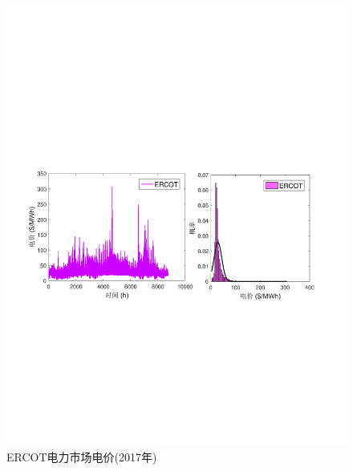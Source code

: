\begin{figure}[H] %
  \centering
  \includegraphics[scale=0.75]{figures/Chap5-15-Price-ERCOT.pdf}
  \caption{ERCOT电力市场电价(2017年)}
  \label{fig:Price-ERCOT}
\end{figure}

